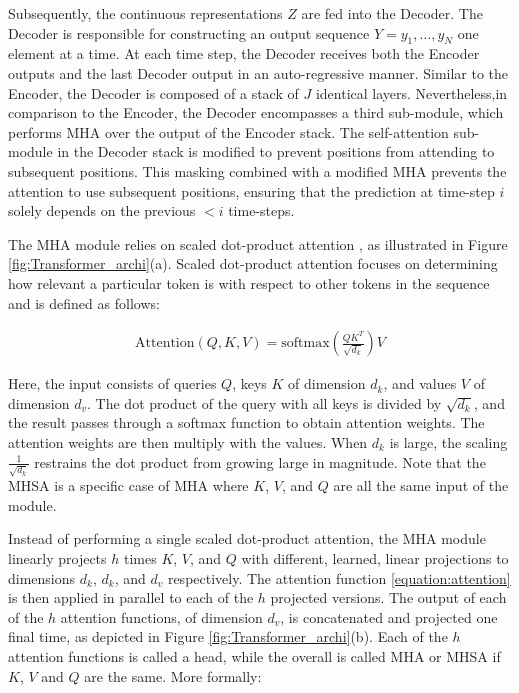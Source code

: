 Subsequently, the continuous representations $Z$ are fed into the Decoder. The Decoder is responsible for constructing an output sequence $Y = y_1, \dots, y_N$ one element at a time. At each time step, the Decoder receives both the Encoder outputs and the last Decoder output in an auto-regressive manner. Similar to the Encoder, the Decoder is composed of a stack of $J$ identical layers. Nevertheless,in comparison to the Encoder, the Decoder encompasses a third sub-module, which performs \ac{MHA} over the output of the Encoder stack. The self-attention sub-module in the Decoder stack is modified to prevent positions from attending to subsequent positions. This masking combined with a modified \ac{MHA} prevents the attention to use subsequent positions, ensuring that the prediction at time-step $i$ solely depends on the previous $< i$ time-steps.

The \ac{MHA} module relies on scaled dot-product attention \cite{vaswani2017attention}, as illustrated in Figure \ref{fig:Transformer_archi}(a). Scaled dot-product attention focuses on determining how relevant a particular token is with respect to other tokens in the sequence and is defined as follows:

\begin{align}
\text{Attention}(Q, K, V) = \text{softmax}\left(\frac{QK^T}{\sqrt{d_k}}\right)V
\label{equation:attention}
\end{align}


Here, the input consists of queries $Q$, keys $K$ of dimension $d_k$, and values $V$ of dimension $d_v$. The dot product of the query with all keys is divided by $\sqrt{d_k}$, and the result passes through a softmax function to obtain attention weights. The attention weights are then multiply with the values. When $d_k$ is large, the scaling  $\frac{1}{\sqrt{d_k}}$ restrains the dot product from growing large in magnitude. Note that the \ac{MHSA} is a specific case of \ac{MHA} where $K$, $V$, and $Q$ are all the same input of the module.

Instead of performing a single scaled dot-product attention, the \ac{MHA} module linearly projects $h$ times $K$, $V$, and $Q$ with different, learned, linear projections to dimensions $d_k$, $d_k$, and $d_v$ respectively. The attention function \ref{equation:attention} is then applied in parallel to each of the $h$ projected versions. The output of each of the $h$ attention functions, of dimension $d_v$, is concatenated and projected one final time, as depicted in Figure \ref{fig:Transformer_archi}(b). Each of the $h$ attention functions is called a head, while the overall is called \ac{MHA} or \ac{MHSA} if $K$, $V$ and $Q$ are the same. More formally:

